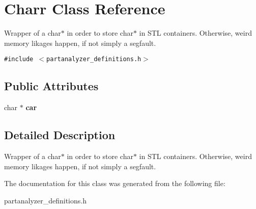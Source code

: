 \section{Charr Class Reference}
\label{classCharr}
Wrapper of a char$\ast$ in order to store char$\ast$ in STL containers. Otherwise, weird memory likages happen, if not simply a segfault.  


{\tt \#include $<$partanalyzer\_\-definitions.h$>$}

\subsection*{Public Attributes}
\begin{CompactItemize}
\item 
char $\ast$ {\bf car}\label{classCharr_o0}

\end{CompactItemize}


\subsection{Detailed Description}
Wrapper of a char$\ast$ in order to store char$\ast$ in STL containers. Otherwise, weird memory likages happen, if not simply a segfault. 



The documentation for this class was generated from the following file:\begin{CompactItemize}
\item 
partanalyzer\_\-definitions.h\end{CompactItemize}
